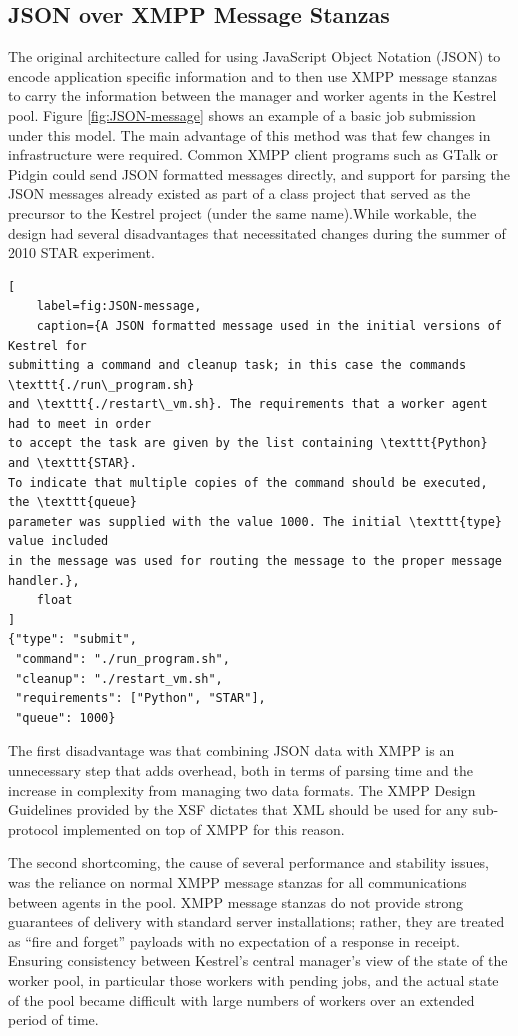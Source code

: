 \subsection{JSON over XMPP Message Stanzas}
The original architecture called for using JavaScript Object Notation (JSON)
\cite{Crockford} to encode application specific information and to then use XMPP
message stanzas to carry the information between the manager and worker agents
in the Kestrel pool. Figure \ref{fig:JSON-message} shows an example of a basic
job submission under this model. The main advantage of this method was that few
changes in infrastructure were required. Common XMPP client programs such as
GTalk or Pidgin could send JSON formatted messages directly, and support for
parsing the JSON messages already existed as part of a class project that served
as the precursor to the Kestrel project (under the same name).While workable,
the design had several disadvantages that necessitated changes during the summer
of 2010 STAR experiment.

\begin{lstlisting}[
    label=fig:JSON-message,
    caption={A JSON formatted message used in the initial versions of Kestrel for
submitting a command and cleanup task; in this case the commands \texttt{./run\_program.sh}
and \texttt{./restart\_vm.sh}. The requirements that a worker agent had to meet in order
to accept the task are given by the list containing \texttt{Python} and \texttt{STAR}.
To indicate that multiple copies of the command should be executed, the \texttt{queue}
parameter was supplied with the value 1000. The initial \texttt{type} value included
in the message was used for routing the message to the proper message handler.},
    float
]
{"type": "submit",
 "command": "./run_program.sh",
 "cleanup": "./restart_vm.sh",
 "requirements": ["Python", "STAR"],
 "queue": 1000}
\end{lstlisting}

The first disadvantage was that combining JSON data with XMPP is an unnecessary
step that adds overhead, both in terms of parsing time and the increase
in complexity from managing two data formats. The XMPP Design Guidelines \cite{XEP-0134}
provided by the XSF \cite{XSF} dictates that XML should be used for any sub-protocol
implemented on top of XMPP for this reason.

The second shortcoming, the cause of several performance and stability issues, was
the reliance on normal XMPP message stanzas for all communications between agents in
the pool. XMPP message stanzas do not provide strong guarantees of delivery with 
standard server installations; rather, they are treated as ``fire and forget'' payloads
\cite{RFC3921} with no expectation of a response in receipt. Ensuring consistency
between Kestrel's central manager's view of the state of the worker pool, in particular
those workers with pending jobs, and the actual state of the pool became difficult with
large numbers of workers over an extended period of time.

